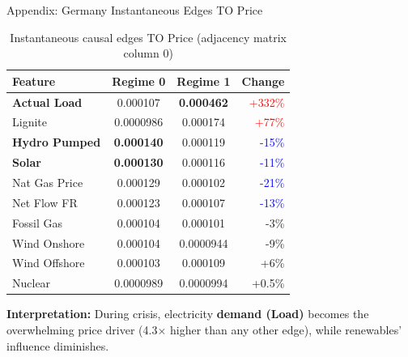 \documentclass[aspectratio=169]{beamer}
\begin{document}
\begin{frame}{Appendix: Germany Instantaneous Edges TO Price}
\begin{table}
\centering
\scriptsize
\begin{tabular}{l|c|c|r}
\toprule
\textbf{Feature} & \textbf{Regime 0} & \textbf{Regime 1} & \textbf{Change} \\
\midrule
\textbf{Actual Load} & 0.000107 & \textbf{0.000462} & \textcolor{red}{+332\%} \\
Lignite & 0.0000986 & 0.000174 & \textcolor{red}{+77\%} \\
\midrule
\textbf{Hydro Pumped} & \textbf{0.000140} & 0.000119 & \textcolor{blue}{-15\%} \\
\textbf{Solar} & \textbf{0.000130} & 0.000116 & \textcolor{blue}{-11\%} \\
Nat Gas Price & 0.000129 & 0.000102 & \textcolor{blue}{-21\%} \\
Net Flow FR & 0.000123 & 0.000107 & \textcolor{blue}{-13\%} \\
\midrule
Fossil Gas & 0.000104 & 0.000101 & -3\% \\
Wind Onshore & 0.000104 & 0.0000944 & -9\% \\
Wind Offshore & 0.000103 & 0.000109 & +6\% \\
Nuclear & 0.0000989 & 0.0000994 & +0.5\% \\
\bottomrule
\end{tabular}
\caption{Instantaneous causal edges TO Price (adjacency matrix column 0)}
\end{table}

\vspace{0.2cm}
{\scriptsize \textbf{Interpretation:} During crisis, electricity \textbf{demand (Load)} becomes the overwhelming price driver (4.3$\times$ higher than any other edge), while renewables' influence diminishes.}
\end{frame}
\end{document}
